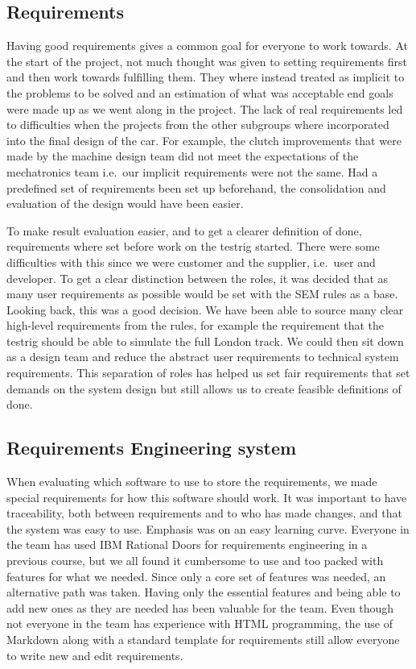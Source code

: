 \subsection{Requirements}
Having good requirements gives a common goal for everyone to work towards. At
the start of the project, not much thought was given to setting requirements
first and then work towards fulfilling them. They where instead treated as
implicit to the problems to be solved and an estimation of what was acceptable
end goals were made up as we went along in the project. The lack of real
requirements led to difficulties when the projects from the other subgroups
where incorporated into the final design of the car. For example, the clutch
improvements that were made by the machine design team did not meet the
expectations of the mechatronics team i.e.\ our implicit requirements were not
the same. Had a predefined set of requirements been set up beforehand, the
consolidation and evaluation of the design would have been easier.

To make result evaluation easier, and to get a clearer definition of done,
requirements where set before work on the testrig started. There were some
difficulties with this since we were customer and the supplier, i.e.\ user and
developer. To get a clear distinction between the roles, it was decided that as
many user requirements as possible would be set with the SEM rules as a base.
Looking back, this was a good decision. We have been able to source many clear
high-level requirements from the rules, for example the requirement that the
testrig should be able to simulate the full London track. We could then sit down
as a design team and reduce the abstract user requirements to technical system
requirements. This separation of roles has helped us set fair requirements that
set demands on the system design but still allows us to create feasible
definitions of done. 

\subsection{Requirements Engineering system}
When evaluating which software to use to store the requirements, we made
special requirements for how this software should work. It was important to have
traceability, both between requirements and to who has made changes, and that
the system was easy to use. Emphasis was on an easy learning curve. Everyone in
the team has used IBM Rational Doors for requirements engineering in a previous
course, but we all found it cumbersome to use and too packed with features for
what we needed. Since only a core set of features was needed, an alternative
path was taken. Having only the essential features and being able to add new
ones as they are needed has been valuable for the team. Even though not everyone
in the team has experience with HTML programming, the use of Markdown along with
a standard template for requirements still allow everyone to write new and edit
requirements. 

